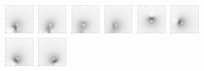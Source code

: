 \documentclass[12pt]{amsart}
\theoremstyle{remark}
\begin{document}
\begin{figure}[h!]
	\includegraphics[width=0.15\textwidth]{./images/grouping_frames/order_1_time_101}
	\includegraphics[width=0.15\textwidth]{./images/grouping_frames/order_1_time_152}
	\includegraphics[width=0.15\textwidth]{./images/grouping_frames/order_1_time_202}
	\includegraphics[width=0.15\textwidth]{./images/grouping_frames/order_1_time_253}	
	\includegraphics[width=0.15\textwidth]{./images/grouping_frames/order_2_time_0}
	\includegraphics[width=0.15\textwidth]{./images/grouping_frames/order_2_time_51}
	\includegraphics[width=0.15\textwidth]{./images/grouping_frames/order_2_time_101}
	\includegraphics[width=0.15\textwidth]{./images/grouping_frames/order_2_time_152}

\end{figure}
\end{document}
